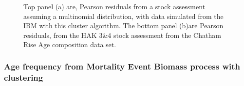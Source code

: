 \begin{figure}[!h]
	\centering
	\qquad
	\caption{Top panel (a) are, Pearson residuals from a stock assessment assuming a multinomial distribution, with data simulated from the IBM with this cluster algorithm. The bottom panel (b)are Pearson residuals, from the HAK 3\&4 stock assessment from the Chatham Rise Age composition data set.}
	\label{fig:ResidsConsistent}
\end{figure}

\pagebreak
\subsubsection{Age frequency from Mortality Event Biomass process with clustering}\label{subsubsec:MortalityEventBiomasssubsamlecluster}

